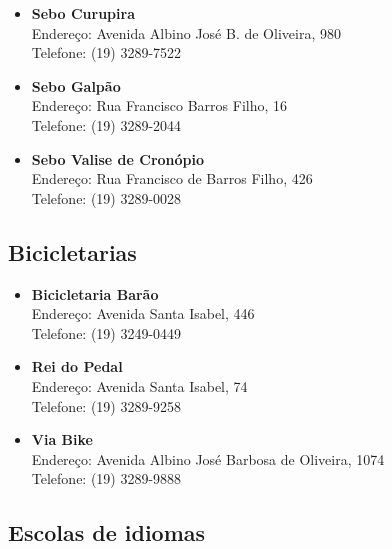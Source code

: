 \begin{itemize}
\item   \textbf{Sebo Curupira}
		\\Endereço: Avenida Albino José B. de Oliveira, 980
		\\Telefone: (19) 3289-7522

\item   \textbf{Sebo Galpão}
		\\Endereço: Rua Francisco Barros Filho, 16
		\\Telefone: (19) 3289-2044

\item   \textbf{Sebo Valise de Cronópio}
		\\Endereço: Rua Francisco de Barros Filho, 426
		\\Telefone: (19) 3289-0028
\end{itemize}

\subsection{Bicicletarias}

\begin{itemize}
\item   \textbf{Bicicletaria Barão}
		\\Endereço: Avenida Santa Isabel, 446
		\\Telefone: (19) 3249-0449

\item   \textbf{Rei do Pedal}
		\\Endereço: Avenida Santa Isabel, 74
		\\Telefone: (19) 3289-9258

\item   \textbf{Via Bike}
		\\Endereço: Avenida Albino José Barbosa de Oliveira, 1074
		\\Telefone: (19) 3289-9888
\end{itemize}

\subsection{Escolas de idiomas}

